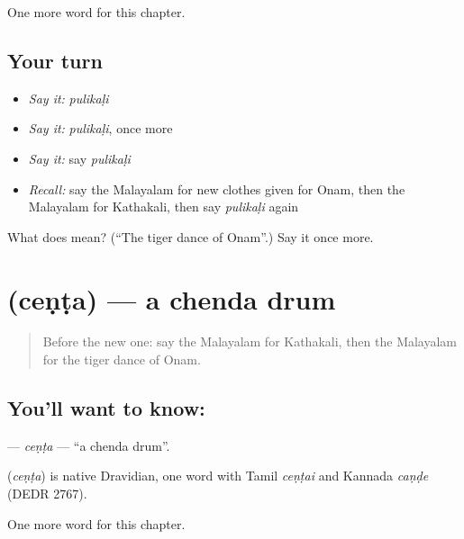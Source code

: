 \begin{grammarlens}[title={What you've built}]
One more word for this chapter.
\end{grammarlens}

\subsection*{Your turn}
\begin{itemize}
\raggedright
  \item \emph{Say it:} \emph{pulikaḷi}
  \item \emph{Say it:} \emph{pulikaḷi}, once more
  \item \emph{Say it:} say \emph{pulikaḷi}
  \item \emph{Recall:} say the Malayalam for new clothes given for Onam, then the Malayalam for Kathakali, then say \emph{pulikaḷi} again
\end{itemize}

\begin{tcolorbox}[breakable,colback=teal!4,colframe=teal!35!black,title={Before you move on}]
What does  mean? (\textquotedblleft{}The tiger dance of Onam\textquotedblright{}.) Say it once more.
\end{tcolorbox}
\section[\texorpdfstring{\ml{ചെണ്ട} (ceṇṭa)}{ചെണ്ട (ceṇṭa)}]{ (ceṇṭa) — a chenda drum}

\label{lesson:ML-C290-centa}



\begin{quote}
Before the new one: say the Malayalam for Kathakali, then the Malayalam for the tiger dance of Onam.
\end{quote}

\subsection*{You'll want to know: }
\textbf{} — \emph{ceṇṭa} — \textquotedblleft{}a chenda drum\textquotedblright{}.

\begin{cousinweb}
\textbf{} (\emph{ceṇṭa}) is native Dravidian, one word with Tamil \emph{ceṇṭai} and Kannada \emph{caṇḍe} (DEDR 2767).
\end{cousinweb}

\begin{grammarlens}[title={What you've built}]
One more word for this chapter.
\end{grammarlens}

